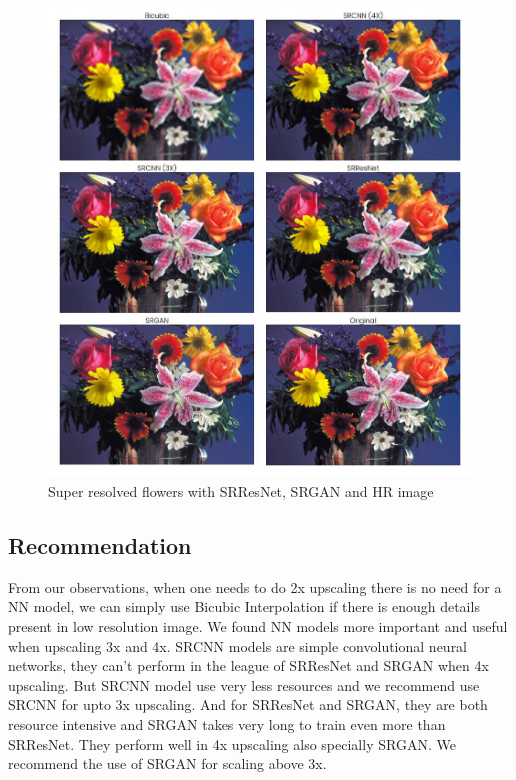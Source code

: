     \newpage
    \begin{figure}
        \centering
        \includegraphics[width=5.5in]{./figures/examples/flowers.jpg}
        \caption{Super resolved flowers  with SRResNet, SRGAN and HR image}
    \end{figure}       
  
\clearpage
\newpage
\subsection{Recommendation}
From our observations, when one needs to do 2x upscaling there is no need for a NN model, we can simply use Bicubic Interpolation if there is enough details present in low resolution image. We found NN models more important and useful when upscaling 3x and 4x. SRCNN models are simple convolutional neural networks, they can't perform in the league of SRResNet and SRGAN when 4x upscaling. But SRCNN model use very less resources and we recommend use SRCNN for upto 3x upscaling. And for SRResNet and SRGAN, they are both resource intensive and SRGAN takes very long to train even more than SRResNet. They perform well in 4x upscaling also specially SRGAN. We recommend the use of SRGAN for scaling above 3x.
